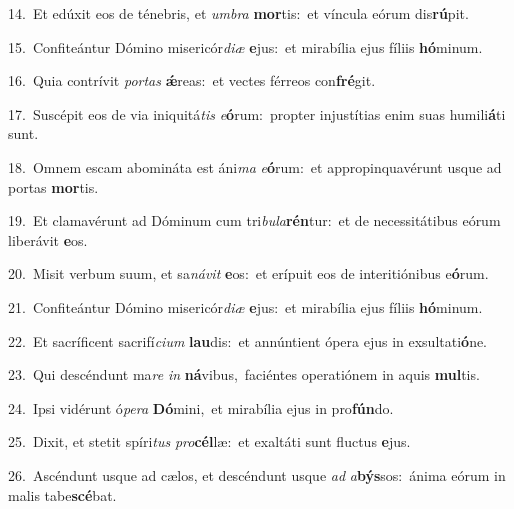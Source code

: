 {\numbfont\textcolor{\numbcolor}{14.}}~Et edúxit eos de ténebris, et \textit{um}\-\textit{bra} \textbf{mor}\-tis:~\star et víncula eórum dis\-\textbf{rú}\-pit.\par
{\numbfont\textcolor{\numbcolor}{15.}}~Confiteántur Dómino misericór\-\textit{di}\-\textit{æ} \textbf{e}\-jus:~\star et mirabília ejus fíliis \textbf{hó}\-minum.\par
{\numbfont\textcolor{\numbcolor}{16.}}~Quia contrívit \textit{por}\-\textit{tas} \textbf{ǽ}\-reas:~\star et vectes férreos con\-\textbf{fré}\-git.\par
{\numbfont\textcolor{\numbcolor}{17.}}~Suscépit eos de via iniquitá\textit{tis} \textit{e}\-\textbf{ó}rum:~\star propter injustítias enim suas humili\-\textbf{á}\-ti sunt.\par
{\numbfont\textcolor{\numbcolor}{18.}}~Omnem escam abomináta est áni\textit{ma} \textit{e}\-\textbf{ó}rum:~\star et appropinquavérunt usque ad portas \textbf{mor}\-tis.\par
{\numbfont\textcolor{\numbcolor}{19.}}~Et clamavérunt ad Dóminum cum tri\-\textit{bu}\-\textit{la}\textbf{rén}tur:~\star et de necessitátibus eórum liberávit \textbf{e}\-os.\par
{\numbfont\textcolor{\numbcolor}{20.}}~Misit verbum suum, et sa\-\textit{ná}\-\textit{vit} \textbf{e}\-os:~\star et erípuit eos de interitiónibus e\-\textbf{ó}\-rum.\par
{\numbfont\textcolor{\numbcolor}{21.}}~Confiteántur Dómino misericór\-\textit{di}\-\textit{æ} \textbf{e}\-jus:~\star et mirabília ejus fíliis \textbf{hó}\-minum.\par
{\numbfont\textcolor{\numbcolor}{22.}}~Et sacríficent sacrifí\-\textit{ci}\-\textit{um} \textbf{lau}\-dis:~\star et annúntient ópera ejus in exsultati\-\textbf{ó}\-ne.\par
{\numbfont\textcolor{\numbcolor}{23.}}~Qui descéndunt ma\textit{re} \textit{in} \textbf{ná}\-vibus,~\star faciéntes operatiónem in aquis \textbf{mul}\-tis.\par
{\numbfont\textcolor{\numbcolor}{24.}}~Ipsi vidérunt ó\-\textit{pe}\-\textit{ra} \textbf{Dó}\-mini,~\star et mirabília ejus in pro\-\textbf{fún}\-do.\par
{\numbfont\textcolor{\numbcolor}{25.}}~Dixit, et stetit spíri\textit{tus} \textit{pro}\-\textbf{cél}læ:~\star et exaltáti sunt fluctus \textbf{e}\-jus.\par
{\numbfont\textcolor{\numbcolor}{26.}}~Ascéndunt usque ad cælos, et descéndunt usque \textit{ad} \textit{a}\-\textbf{býs}sos:~\star ánima eórum in malis tabe\-\textbf{scé}\-bat.\par
